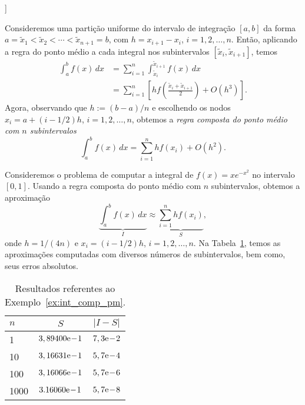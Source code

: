 \begin{flushleft}
  [[tag:revisar]]
\end{flushleft}

Consideremos uma partição uniforme do intervalo de integração $[a, b]$ da forma $a=\tilde{x}_1 < \tilde{x}_2 < \cdots < \tilde{x}_{n+1}=b$, com $h=x_{i+1}-x_{i}$, $i=1, 2, \dotsc, n$. Então, aplicando a regra do ponto médio a cada integral nos subintervalos $[\tilde{x}_i, \tilde{x}_{i+1}]$, temos
\begin{align}
  \int_a^b f(x)\,dx &= \sum_{i=1}^{n}\int_{\tilde{x}_i}^{\tilde{x}_{i+1}}f(x)\,dx\\
  &= \sum_{i=1}^n \left[hf\left(\frac{\tilde{x}_i+\tilde{x}_{i+1}}{2}\right) + O(h^3)\right].
\end{align}
Agora, observando que $h:=(b-a)/n$ e escolhendo os nodos $x_i = a + (i-1/2)h$, $i=1, 2, \dotsc, n$, obtemos a \emph{regra composta do ponto médio com $n$ subintervalos}
\begin{equation}
  \int_a^b f(x)\,dx = \sum_{i=1}^n hf(x_i) + O(h^2).
\end{equation}

\begin{ex}\label{ex:int_comp_pm}
  Consideremos o problema de computar a integral de $f(x)=xe^{-x^2}$ no intervalo $[0, 1]$. Usando a regra composta do ponto médio com $n$ subintervalos, obtemos a aproximação
  \begin{equation}
    \underbrace{\int_a^b f(x)\,dx}_{I} \approx \underbrace{\sum_{i=1}^n hf(x_i)}_{S},
  \end{equation}
onde $h=1/(4n)$ e $x_i = (i-1/2)h$, $i=1, 2, \dotsc, n$. Na Tabela~\ref{tab:ex_int_comp_pm}, temos as aproximações computadas com diversos números de subintervalos, bem como, seus erros absolutos.

\begin{table}[h!]
  \centering
  \caption{Resultados referentes ao Exemplo~\ref{ex:int_comp_pm}.}
  \begin{tabular}{l|cc}
    $n$ & $S$ & $|I-S|$ \\\hline
    1   & $3,89400\mathrm{e}\!-\!1$ & $7,3\mathrm{e}\!-\!2$ \\
    10  & $3,16631\mathrm{e}\!-\!1$ & $5,7\mathrm{e}\!-\!4$ \\
    100 & $3,16066\mathrm{e}\!-\!1$ & $5,7\mathrm{e}\!-\!6$ \\
    1000& $3.16060\mathrm{e}\!-\!1$ & $5,7\mathrm{e}\!-\!8$ \\\hline
  \end{tabular}
  \label{tab:ex_int_comp_pm}
\end{table}

\end{ex}

